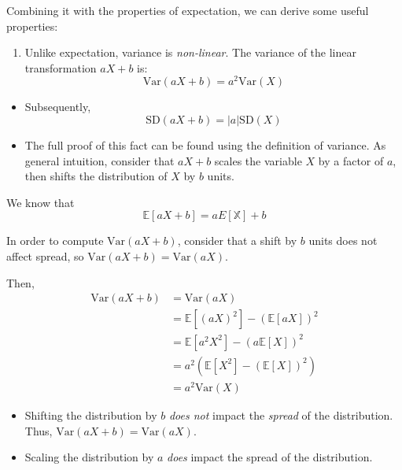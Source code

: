 \documentclass[
  letterpaper,
  DIV=11,
  numbers=noendperiod]{scrreprt}
\providecommand{\tightlist}{%
  \setlength{\itemsep}{0pt}\setlength{\parskip}{0pt}}\usepackage{longtable,booktabs,array}
\begin{document}
Combining it with the properties of expectation, we can derive some
useful properties:

\begin{enumerate}
\def\labelenumi{\arabic{enumi}.}
\tightlist
\item
  Unlike expectation, variance is \emph{non-linear}. The variance of the
  linear transformation \(aX+b\) is:
  \[\text{Var}(aX+b) = a^2 \text{Var}(X)\]
\end{enumerate}

\begin{itemize}
\tightlist
\item
  Subsequently, \[\text{SD}(aX+b) = |a| \text{SD}(X)\]
\item
  The full proof of this fact can be found using the definition of
  variance. As general intuition, consider that \(aX+b\) scales the
  variable \(X\) by a factor of \(a\), then shifts the distribution of
  \(X\) by \(b\) units.
\end{itemize}

\begin{tcolorbox}[enhanced jigsaw, arc=.35mm, left=2mm, toprule=.15mm, leftrule=.75mm, bottomrule=.15mm, colframe=quarto-callout-tip-color-frame, rightrule=.15mm, colbacktitle=quarto-callout-tip-color!10!white, opacitybacktitle=0.6, coltitle=black, bottomtitle=1mm, colback=white, toptitle=1mm, title=\textcolor{quarto-callout-tip-color}{\faLightbulb}\hspace{0.5em}{Proof}, breakable, opacityback=0, titlerule=0mm]

We know that \[\mathbb{E}[aX+b] = aE[\mathbb{X}] + b\]

In order to compute \(\text{Var}(aX+b)\), consider that a shift by \(b\)
units does not affect spread, so \(\text{Var}(aX+b) = \text{Var}(aX)\).

Then, \[\begin{align}
    \text{Var}(aX+b) &= \text{Var}(aX) \\
    &= \mathbb{E}[(aX)^2] - (\mathbb{E}[aX])^2 \\
    &= \mathbb{E}[a^2 X^2] - (a\mathbb{E}[X])^2\\
    &= a^2 (\mathbb{E}[X^2] - (\mathbb{E}[X])^2) \\
    &= a^2 \text{Var}(X)
\end{align}\]

\end{tcolorbox}

\begin{itemize}
\tightlist
\item
  Shifting the distribution by \(b\) \emph{does not} impact the
  \emph{spread} of the distribution. Thus,
  \(\text{Var}(aX+b) = \text{Var}(aX)\).
\item
  Scaling the distribution by \(a\) \emph{does} impact the spread of the
  distribution.
\end{itemize}
\end{document}
